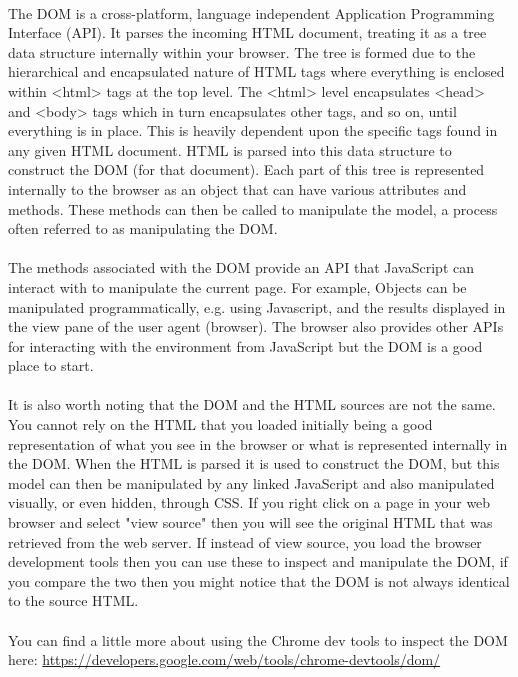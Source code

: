\paragraph{} The DOM is a cross-platform, language independent Application Programming Interface (API). It parses the incoming HTML document, treating it as a tree data structure internally within your browser. The tree is formed due to the hierarchical and encapsulated nature of HTML tags where everything is enclosed within <html> tags at the top level. The <html> level encapsulates <head> and <body> tags which in turn encapsulates other tags, and so on, until everything is in place. This is heavily dependent upon the specific tags found in any given HTML document. HTML is parsed into this data structure to construct the DOM (for that document). Each part of this tree is represented internally to the browser as an object that can have various attributes and methods. These methods can then be called to manipulate the model, a process often referred to as manipulating the DOM. 
\paragraph{} The methods associated with the DOM provide an API that JavaScript can interact with to manipulate the current page. For example, Objects can be manipulated programmatically, e.g. using Javascript, and the results displayed in the view pane of the user agent (browser). The browser also provides other APIs for interacting with the environment from JavaScript but the DOM is a good place to start.
\paragraph{} It is also worth noting that the DOM and the HTML sources are not the same. You cannot rely on the HTML that you loaded initially being a good representation of what you see in the browser or what is represented internally in the DOM. When the HTML is parsed it is used to construct the DOM, but this model can then be manipulated by any linked JavaScript and also manipulated visually, or even hidden, through CSS. If you right click on a page in your web browser and select "view source" then you will see the original HTML that was retrieved from the web server. If instead of view source, you load the browser development tools then you can use these to inspect and manipulate the DOM, if you compare the two then you might notice that the DOM is not always identical to the source HTML.
\paragraph{} You can find a little more about using the Chrome dev tools to inspect the DOM here:
	\url{https://developers.google.com/web/tools/chrome-devtools/dom/}
